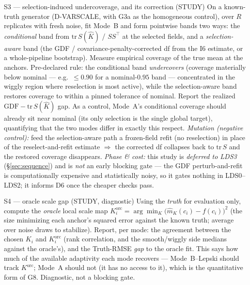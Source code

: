 \documentclass[11pt]{article}
\begin{document}
\begin{gate}{S3 --- selection-induced undercoverage, and its correction (STUDY)}
On a known-truth generator (D-VARSCALE, with G3a as the homogeneous control), over $R$
replicates with fresh noise, fit Mode~B and form pointwise bands two ways: the
\emph{conditional} band from $\mathrm{tr}\,S(\hat K)$ / $SS^\top$ at the selected
fields, and a \emph{selection-aware} band (the GDF / covariance-penalty-corrected df
from the I6 estimate, or a whole-pipeline bootstrap). Measure empirical coverage of the
true mean at the anchors. Pre-declared rule: the conditional band \emph{undercovers}
(coverage materially below nominal --- e.g.\ $\le 0.90$ for a nominal-$0.95$ band ---
concentrated in the wiggly region where reselection is most active), while the
selection-aware band restores coverage to within a pinned tolerance of nominal. Report
the realized $\mathrm{GDF}-\mathrm{tr}\,S(\hat K)$ gap. As a control, Mode~A's
conditional coverage should already sit near nominal (its only selection is the single
global target), quantifying that the two modes differ in exactly this respect.
\emph{Mutation (negative control):} feed the selection-aware path a frozen-field refit
(no reselection) in place of the reselect-and-refit estimate $\Rightarrow$ the corrected
df collapses back to $\mathrm{tr}\,S$ and the restored coverage disappears.
\emph{Phase \& cost:} this study is \emph{deferred to LDS3} (\S\ref{sec:sequence}) and is
\emph{not} an early blocking gate --- the GDF perturb-and-refit is computationally
expensive and statistically noisy, so it gates nothing in LDS0--LDS2; it informs D6 once
the cheaper checks pass.
\end{gate}

\begin{gate}{S4 --- oracle scale gap (STUDY, diagnostic)}
Using the \emph{truth} for evaluation only, compute the \emph{oracle} local scale map
$K^{\mathrm{orc}}_i=\arg\min_{K}\big(\hat m_K(c_i)-f(c_i)\big)^2$ (the size minimizing each
anchor's squared error against the known truth; average over noise draws to stabilize).
Report, per mode: the agreement between the chosen $K_i$ and $K^{\mathrm{orc}}_i$ (rank
correlation, and the smooth/wiggly side medians against the oracle's), and the Truth-RMSE
\emph{gap} to the oracle fit. This says how much of the available adaptivity each mode
recovers --- Mode~B--Lepski should track $K^{\mathrm{orc}}$; Mode~A should not (it has no
access to it), which is the quantitative form of G8. Diagnostic, not a blocking gate.
\end{gate}
\end{document}
